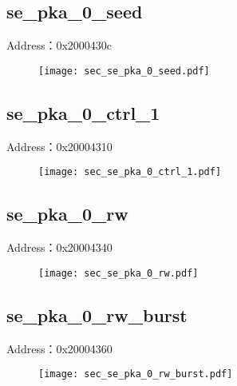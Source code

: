 \subsection{se\_pka\_0\_seed}
\label{sec-se-pka-0-seed}
Address：0x2000430c
 \begin{figure}[H]
\texttt{[image: sec\_se\_pka\_0\_seed.pdf]}
\end{figure}

\subsection{se\_pka\_0\_ctrl\_1}
\label{sec-se-pka-0-ctrl-1}
Address：0x20004310
 \begin{figure}[H]
\texttt{[image: sec\_se\_pka\_0\_ctrl\_1.pdf]}
\end{figure}

\subsection{se\_pka\_0\_rw}
\label{sec-se-pka-0-rw}
Address：0x20004340
 \begin{figure}[H]
\texttt{[image: sec\_se\_pka\_0\_rw.pdf]}
\end{figure}

\subsection{se\_pka\_0\_rw\_burst}
\label{sec-se-pka-0-rw-burst}
Address：0x20004360
 \begin{figure}[H]
\texttt{[image: sec\_se\_pka\_0\_rw\_burst.pdf]}
\end{figure}

